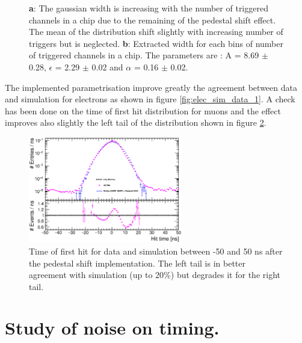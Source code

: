 \documentclass[twoside,a4paper,11pt]{article}
\begin{document}
\begin{appendix}
\begin{figure}[htbp]
	\caption[]{\textbf{a}: The gaussian width is increasing with the number of triggered channels in a chip due to the remaining of the pedestal shift effect. The mean of the distribution shift slightly with increasing number of triggers but is neglected. \textbf{b}: Extracted width for each bins of number of triggered channels in a chip. The parameters are : A = 8.69 $\pm$ 0.28, $\epsilon$ = 2.29 $\pm$ 0.02 and $\alpha$ = 0.16 $\pm$ 0.02.}
	\label{fig:mc_para}
\end{figure}
The implemented parametrisation improve greatly the agreement between data and simulation for electrons as shown in figure \ref{fig:elec_sim_data_1}. A check has been done on the time of first hit distribution for muons and the effect improves also slightly the left tail of the distribution shown in figure \ref{fig:muon_ped_shift}.
\begin{figure}[htbp]
\begin{center}
\includegraphics[width=0.6\textwidth]{fig/Comparison_SimData_Muons_PedShift.eps}
\caption{Time of first hit for data and simulation between -50 and 50 ns after the pedestal shift implementation. The left tail is in better agreement with simulation (up to 20\%) but degrades it for the right tail.}
\label{fig:muon_ped_shift}
\end{center}
\end{figure}
\newpage
\section{Study of noise on timing.}
\label{appendix:noise_timing}


\end{appendix}
\end{document}
